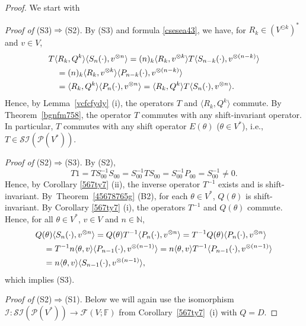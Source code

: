 \documentclass[12pt]{article}
\theoremstyle{remark}
\theoremstyle{remark}
\theoremstyle{remark}
\begin{document}
\begin{proof} We start with 

{\it Proof of\/} (S3)$\Rightarrow$(S2). By (S3) and formula \eqref{csesea43}, we have, for $R_k\in (V^{\odot k})^*$ and $v\in V$, 
\begin{align}
&T\langle R_k,Q^{k}\rangle \langle S_n(\cdot),v^{\otimes n}\rangle=
(n)_k\langle R_k,v^{\otimes k}\rangle T\langle S_{n-k}(\cdot),v^{\otimes (n-k)}\rangle\notag\\
&\quad=(n)_k\langle R_k,v^{\otimes k}\rangle \langle P_{n-k}(\cdot),v^{\otimes (n-k)}\rangle\notag\\
&\quad =\langle R_k,Q^{k}\rangle\langle P_n(\cdot),v^{\otimes n}\rangle=
\langle R_k,Q^{k}\rangle T\langle S_n(\cdot),v^{\otimes n}\rangle.\notag
\end{align} 
Hence, by Lemma~\ref{vcfcfydy} (i), the operators $T$ and $\langle R_k,Q^{k}\rangle$ commute. By Theorem~\ref{bgnfm758}, the operator $T$ commutes with any shift-invariant operator. In particular, $T$ commutes with any shift operator $E(\theta)$ ($\theta\in V^*$), i.e., $T\in \mathcal{SI}(\mathcal P(V^*))$. 

{\it Proof of\/} (S2)$\Rightarrow$(S3). By (S2),
$$T1=TS^{-1}_{00}S_{00}=S^{-1}_{00}TS_{00}=S^{-1}_{00}P_{00}=S^{-1}_{00}\neq 0.$$ Hence, by Corollary \ref{567ty7} (ii), the inverse operator $T^{-1}$ exists and is shift-invariant. By~Theorem~\ref{45678765g} (B2), for each $\theta \in V^*$, $Q(\theta)$ is shift-invariant. By Corollary \ref{567ty7} (i), the operators $T^{-1}$ and $Q(\theta)$ commute. Hence, for all $\theta \in V^*$, $v\in V$ and $n\in \mathbb N$,
\begin{align}
&Q(\theta)\langle S_n(\cdot),v^{\otimes n}\rangle=Q(\theta)T^{-1}\langle P_n(\cdot),v^{\otimes n}\rangle=T^{-1}Q(\theta)\langle P_n(\cdot),v^{\otimes n}\rangle\notag\\
&\quad =T^{-1}n\langle \theta,v \rangle \langle P_{n-1}(\cdot),v^{\otimes (n-1)}\rangle 
=n\langle \theta,v \rangle T^{-1} \langle P_{n-1}(\cdot),v^{\otimes (n-1)}\rangle \notag\\
&\quad =n\langle \theta,v \rangle \langle S_{n-1}(\cdot),v^{\otimes (n-1)}\rangle, \notag %
\end{align}
which implies (S3).

{\it Proof of \/} (S2)$\Rightarrow$(S1). Below we will again use the isomorphism  $\mathcal I:\mathcal{SI}(\mathcal P  (V^*))\to \mathcal F(V;\mathbb F)$ from Corollary~\ref{567ty7}~(i) with $Q=D$. 



\end{proof}
\end{document}
